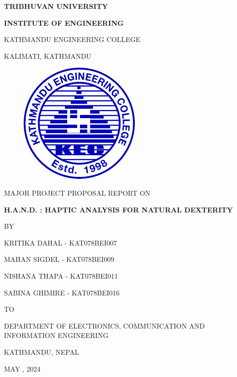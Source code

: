 \begin{titlepage}
    \thispagestyle{empty}
    \begin{center}
    
    \vspace*{\fill} %
    \vspace*{-1cm}
    {\large \textbf{TRIBHUVAN UNIVERSITY
}\par}
{\large \textbf{INSTITUTE OF ENGINEERING
}\par}
\vspace{8pt}
KATHMANDU ENGINEERING COLLEGE

KALIMATI, KATHMANDU
\vspace{24pt}

\begin{figure}[ht]
    \centering
    \includegraphics[scale=0.45]{images/kec.png}
\end{figure}
\vspace{24pt}
{MAJOR PROJECT PROPOSAL REPORT ON\par}
\vspace{14pt}
{\textbf{ H.A.N.D. : HAPTIC ANALYSIS FOR NATURAL DEXTERITY}\par}

\vspace{14pt}
{BY\par}
\vspace{14pt}

{KRITIKA DAHAL - KAT078BEI007\par}
{MAHAN SIGDEL - KAT078BEI009\par}
{NISHANA THAPA - KAT078BEI011\par}
{SABINA GHIMIRE - KAT078BEI016\par}

\vspace{24pt}
{TO\par}
\vspace{14pt}
{DEPARTMENT OF ELECTRONICS, COMMUNICATION AND INFORMATION ENGINEERING\par}
{KATHMANDU, NEPAL\par}
{MAY , 2024\par}


    \end{center}
\end{titlepage}